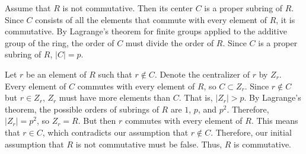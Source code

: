 \documentclass{article}
\begin{document}
Assume that \(R\) is not commutative. Then its center \(C\) is a proper subring of \(R\). Since \(C\) consists of all the elements that commute with every element of \(R\), it is commutative. By Lagrange's theorem for finite groups applied to the additive group of the ring, the order of \(C\) must divide the order of \(R\). Since \(C\) is a proper subring of \(R\), \(|C|=p\). 

Let \(r\) be an element of \(R\) such that \(r\notin C\). Denote the centralizer of \(r\) by \(Z_r\). Every element of \(C\) commutes with every element of \(R\), so \(C\subset Z_r\). Since \(r\notin C\) but \(r\in Z_r\), \(Z_r\) must have more elements than \(C\). That is, \(|Z_r|>p\). By Lagrange's theorem, the possible orders of subrings of \(R\) are \(1\), \(p\), and \(p^2\). Therefore, \(|Z_r|=p^2\), so \(Z_r=R\). But then \(r\) commutes with every element of \(R\). This means that \(r\in C\), which contradicts our assumption that \(r\notin C\). Therefore, our initial assumption that \(R\) is not commutative must be false. Thus, \(R\) is commutative.
\end{document}
